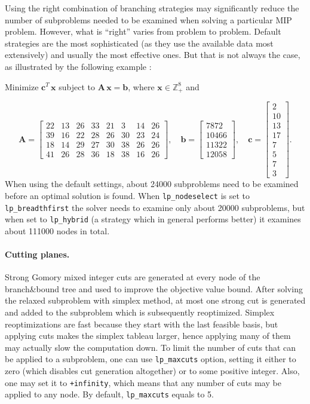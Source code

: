 \documentclass[a4paper,11pt]{book}
\begin{document}
Using the right combination of branching strategies may significantly reduce the number of subproblems needed to be examined when solving a particular MIP problem. However, what is ``right'' varies from problem to problem. Default strategies are the most sophisticated (as they use the available data most extensively) and usually the most effective ones. But that is not always the case, as illustrated by the following example :
\begin{center}
	Minimize $ \mathbf{c}^T\,\mathbf{x} $ subject to $ \mathbf{A}\,\mathbf{x}=\mathbf{b} $, where $ \mathbf{x}\in\mathbb{Z}_+^8 $ and
\end{center}
\[ \mathbf{A}=\begin{bmatrix}
22 & 13 & 26 & 33 & 21 & 3 & 14 & 26 \\
39 & 16 & 22 & 28 & 26 & 30 & 23 & 24 \\
18 & 14 & 29 & 27 & 30 & 38 & 26 & 26 \\
41 & 26 & 28 & 36 & 18 & 38 & 16 & 26
\end{bmatrix},\quad\mathbf{b}=\begin{bmatrix} 7872 \\ 10466 \\ 11322 \\ 12058 \end{bmatrix},\quad\mathbf{c}=\begin{bmatrix}
2 \\10 \\13 \\17 \\7 \\5 \\7 \\3
\end{bmatrix}. \]
When using the default settings, about 24000 subproblems need to be examined before an optimal solution is found. When {\tt lp\_nodeselect} is set to {\tt lp\_breadthfirst} the solver needs to examine only about 20000 subproblems, but when set to {\tt lp\_hybrid} (a strategy which in general performs better) it examines about 111000 nodes in total.

\paragraph{Cutting planes.}
Strong Gomory mixed integer cuts are generated at every node of the branch\&bound tree and used to improve the objective value bound. After solving the relaxed subproblem with simplex method, at most one strong cut is generated and added to the subproblem which is subsequently reoptimized. Simplex reoptimizations are fast because they start with the last feasible basis, but applying cuts makes the simplex tableau larger, hence applying many of them may actually slow the computation down. To limit the number of cuts that can be applied to a subproblem, one can use {\tt lp\_maxcuts} option, setting it either to zero (which disables cut generation altogether) or to some positive integer. Also, one may set it to {\tt +infinity}, which means that any number of cuts may be applied to any node. By default, {\tt lp\_maxcuts} equals to 5.
\end{document}
